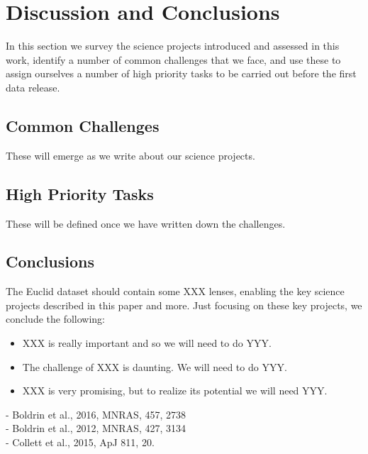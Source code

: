 \documentclass{article}
\begin{document}

\section{Discussion and Conclusions} 
\label{sec:conclusions}

In this section we survey the science projects introduced and assessed in this 
work, identify a number of common challenges that we face, and use these to 
assign ourselves a number of high priority tasks to be carried out before the
first data release.

\subsection{Common Challenges}

These will emerge as we write about our science projects.


\subsection{High Priority Tasks}

These will be defined once we have written down the challenges.


\subsection{Conclusions}

The Euclid dataset should contain some XXX lenses, enabling the key science
projects described in this paper and more. Just focusing on these key projects,
we conclude the following:

\begin{itemize}

\item XXX is really important and so we will need to do YYY.

\item The challenge of XXX is daunting. We will need to do YYY.

\item XXX is very promising, but to realize its potential we will need YYY.

\end{itemize}



% 
% 
\noindent
- Boldrin et al., 2016, MNRAS, 457, 2738\\
- Boldrin et al., 2012, MNRAS, 427, 3134\\
- Collett et al., 2015, ApJ 811, 20.\\
\end{document}
